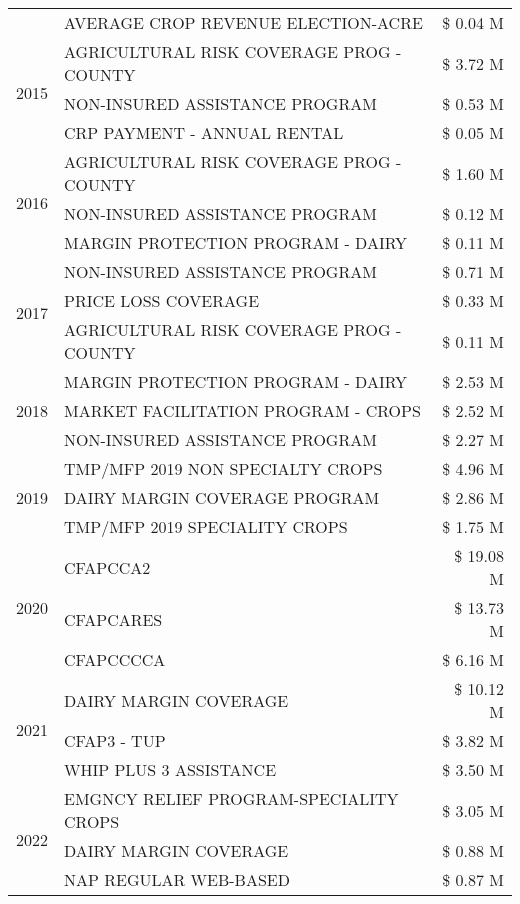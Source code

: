 \begin{tabular}{llr}
 & AVERAGE CROP REVENUE ELECTION-ACRE & \$ 0.04 M \\
\cline{1-3}
\multirow[t]{3}{*}{2015} & AGRICULTURAL RISK COVERAGE PROG - COUNTY & \$ 3.72 M \\
 & NON-INSURED ASSISTANCE PROGRAM & \$ 0.53 M \\
 & CRP PAYMENT - ANNUAL RENTAL & \$ 0.05 M \\
\cline{1-3}
\multirow[t]{3}{*}{2016} & AGRICULTURAL RISK COVERAGE PROG - COUNTY & \$ 1.60 M \\
 & NON-INSURED ASSISTANCE PROGRAM & \$ 0.12 M \\
 & MARGIN PROTECTION PROGRAM - DAIRY & \$ 0.11 M \\
\cline{1-3}
\multirow[t]{3}{*}{2017} & NON-INSURED ASSISTANCE PROGRAM & \$ 0.71 M \\
 & PRICE LOSS COVERAGE & \$ 0.33 M \\
 & AGRICULTURAL RISK COVERAGE PROG - COUNTY & \$ 0.11 M \\
\cline{1-3}
\multirow[t]{3}{*}{2018} & MARGIN PROTECTION PROGRAM - DAIRY & \$ 2.53 M \\
 & MARKET FACILITATION PROGRAM - CROPS & \$ 2.52 M \\
 & NON-INSURED ASSISTANCE PROGRAM & \$ 2.27 M \\
\cline{1-3}
\multirow[t]{3}{*}{2019} & TMP/MFP 2019 NON SPECIALTY CROPS & \$ 4.96 M \\
 & DAIRY MARGIN COVERAGE PROGRAM & \$ 2.86 M \\
 & TMP/MFP 2019 SPECIALITY CROPS & \$ 1.75 M \\
\cline{1-3}
\multirow[t]{3}{*}{2020} & CFAPCCA2 & \$ 19.08 M \\
 & CFAPCARES & \$ 13.73 M \\
 & CFAPCCCCA & \$ 6.16 M \\
\cline{1-3}
\multirow[t]{3}{*}{2021} & DAIRY MARGIN COVERAGE & \$ 10.12 M \\
 & CFAP3 - TUP & \$ 3.82 M \\
 & WHIP PLUS 3 ASSISTANCE & \$ 3.50 M \\
\cline{1-3}
\multirow[t]{3}{*}{2022} & EMGNCY RELIEF PROGRAM-SPECIALITY CROPS & \$ 3.05 M \\
 & DAIRY MARGIN COVERAGE & \$ 0.88 M \\
 & NAP REGULAR WEB-BASED & \$ 0.87 M \\
\cline{1-3}
\bottomrule
\end{tabular}

